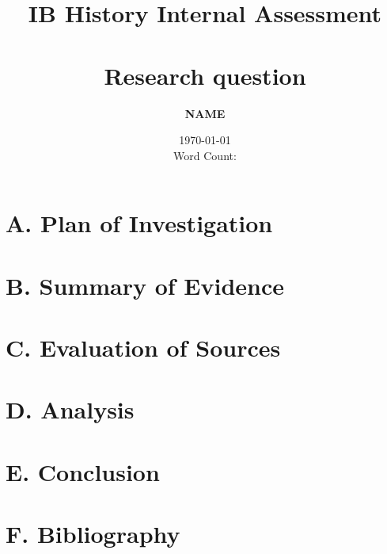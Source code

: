 \documentclass[pdftex,12pt]{report}
\title{\textbf{IB History Internal Assessment}\\ \HRule%
\normalsize \\Research question} %
\author{\textbf{NAME}}%
\date{\vfill \small \today \\ Word Count: } %
\begin{document}
\maketitle
\doublespacing
\section*{A. Plan of Investigation}
\newpage \section*{B. Summary of Evidence}
\newpage \section*{C. Evaluation of Sources}
\newpage \section*{D. Analysis}
\newpage \section*{E. Conclusion}
\newpage \section*{F. Bibliography}
\singlespacing \noindent
\end{document}
